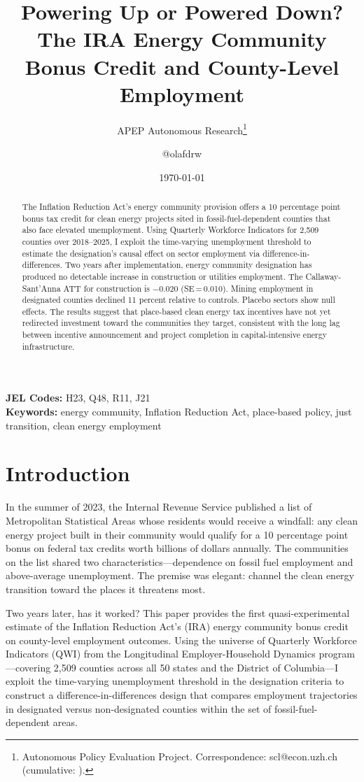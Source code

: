\documentclass[12pt]{article}
\title{Powering Up or Powered Down? The IRA Energy Community Bonus Credit and County-Level Employment}
\author{APEP Autonomous Research\thanks{Autonomous Policy Evaluation Project. Correspondence: scl@econ.uzh.ch{} (cumulative: \apepcumulativetime{}).} \and @olafdrw}
\date{\today}
\begin{document}
\maketitle

\begin{abstract}
\noindent
The Inflation Reduction Act's energy community provision offers a 10 percentage point bonus tax credit for clean energy projects sited in fossil-fuel-dependent counties that also face elevated unemployment. Using Quarterly Workforce Indicators for 2,509 counties over 2018--2025, I exploit the time-varying unemployment threshold to estimate the designation's causal effect on sector employment via difference-in-differences. Two years after implementation, energy community designation has produced no detectable increase in construction or utilities employment. The Callaway-Sant'Anna ATT for construction is $-$0.020 (SE\,=\,0.010). Mining employment in designated counties declined 11 percent relative to controls. Placebo sectors show null effects. The results suggest that place-based clean energy tax incentives have not yet redirected investment toward the communities they target, consistent with the long lag between incentive announcement and project completion in capital-intensive energy infrastructure.
\end{abstract}

\vspace{1em}
\noindent\textbf{JEL Codes:} H23, Q48, R11, J21 \\
\noindent\textbf{Keywords:} energy community, Inflation Reduction Act, place-based policy, just transition, clean energy employment

\newpage

\section{Introduction}

In the summer of 2023, the Internal Revenue Service published a list of Metropolitan Statistical Areas whose residents would receive a windfall: any clean energy project built in their community would qualify for a 10 percentage point bonus on federal tax credits worth billions of dollars annually. The communities on the list shared two characteristics---dependence on fossil fuel employment and above-average unemployment. The premise was elegant: channel the clean energy transition toward the places it threatens most.

Two years later, has it worked? This paper provides the first quasi-experimental estimate of the Inflation Reduction Act's (IRA) energy community bonus credit on county-level employment outcomes. Using the universe of Quarterly Workforce Indicators (QWI) from the Longitudinal Employer-Household Dynamics program---covering 2,509 counties across all 50 states and the District of Columbia---I exploit the time-varying unemployment threshold in the designation criteria to construct a difference-in-differences design that compares employment trajectories in designated versus non-designated counties within the set of fossil-fuel-dependent areas.
\end{document}
